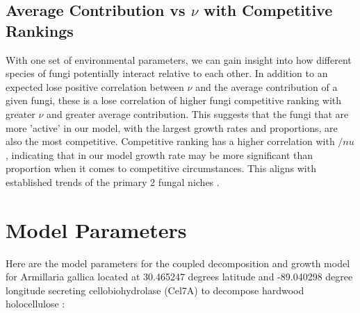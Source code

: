 \documentclass{article}
\begin{document}
\subsection{Average Contribution vs $\nu$ with Competitive Rankings} %
With one set of environmental parameters, we can gain insight into how different species of fungi potentially interact relative to each other. In addition to an expected lose positive correlation between $\nu$ and the average contribution of a given fungi, these is a lose correlation of higher fungi competitive ranking with greater $\nu$ and greater average contribution. This suggests that the fungi that are more 'active' in our model, with the largest growth rates and proportions, are also the most competitive. Competitive ranking has a higher correlation with $/nu$, indicating that in our model growth rate may be more significant than proportion when it comes to competitive circumstances. This aligns with established trends of the primary 2 fungal niches \cite{Maynard2019}.

\newpage
\section{Model Parameters}

Here are the model parameters for the coupled decomposition and growth model for Armillaria gallica located at 30.465247 degrees latitude and -89.040298 degree longitude secreting cellobiohydrolase (Cel7A) to decompose hardwood holocellulose \cite{Maynard2019} \cite{Kari2014}:
\end{document}

